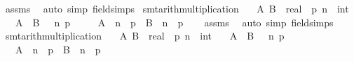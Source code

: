 \begin{isabellebody}
\ assms\ \isamarkupfalse%
\ {\isacharparenleft}{\kern0pt}auto\ simp{\isacharcolon}{\kern0pt}\ field{\isacharunderscore}{\kern0pt}simps{\isacharparenright}{\kern0pt}%
\endisatagproof
{\isafoldproof}%
%
\isadelimproof
\isanewline
%
\endisadelimproof
\isanewline
{}\isamarkupfalse%
\ {\isacharbrackleft}{\kern0pt}smt{\isacharunderscore}{\kern0pt}arith{\isacharunderscore}{\kern0pt}multiplication{\isacharbrackright}{\kern0pt}{\isacharcolon}{\kern0pt}\isanewline
\ \ \ A\ B\ {\isacharcolon}{\kern0pt}{\isacharcolon}{\kern0pt}\ real\ \ p\ n\ {\isacharcolon}{\kern0pt}{\isacharcolon}{\kern0pt}\ int\isanewline
\ \ \ {\isachardoublequoteopen}A\ {\isasymle}\ B{\isachardoublequoteclose}\ {\isachardoublequoteopen}{}\ {\isacharless}{\kern0pt}\ n{\isachardoublequoteclose}\ {\isachardoublequoteopen}p\ {\isachargreater}{\kern0pt}\ {}{\isachardoublequoteclose}\isanewline
\ \ \ {\isachardoublequoteopen}{\isacharparenleft}{\kern0pt}A\ {\isacharslash}{\kern0pt}\ n{\isacharparenright}{\kern0pt}\ {\isacharasterisk}{\kern0pt}\ p\ {\isasymle}\ {\isacharparenleft}{\kern0pt}B\ {\isacharslash}{\kern0pt}\ n{\isacharparenright}{\kern0pt}\ {\isacharasterisk}{\kern0pt}\ p{\isachardoublequoteclose}\isanewline
%
\isadelimproof
\ \ %
\endisadelimproof
%
\isatagproof
{}\isamarkupfalse%
\ assms\ \isamarkupfalse%
\ {\isacharparenleft}{\kern0pt}auto\ simp{\isacharcolon}{\kern0pt}\ field{\isacharunderscore}{\kern0pt}simps{\isacharparenright}{\kern0pt}%
\endisatagproof
{\isafoldproof}%
%
\isadelimproof
\isanewline
%
\endisadelimproof
\isanewline
{}\isamarkupfalse%
\ {\isacharbrackleft}{\kern0pt}smt{\isacharunderscore}{\kern0pt}arith{\isacharunderscore}{\kern0pt}multiplication{\isacharbrackright}{\kern0pt}{\isacharcolon}{\kern0pt}\isanewline
\ \ \ A\ B\ {\isacharcolon}{\kern0pt}{\isacharcolon}{\kern0pt}\ real\ \ p\ n\ {\isacharcolon}{\kern0pt}{\isacharcolon}{\kern0pt}\ int\isanewline
\ \ \ {\isachardoublequoteopen}A\ {\isacharless}{\kern0pt}\ B{\isachardoublequoteclose}\ {\isachardoublequoteopen}{}\ {\isacharless}{\kern0pt}\ n{\isachardoublequoteclose}\ {\isachardoublequoteopen}p\ {\isachargreater}{\kern0pt}\ {}{\isachardoublequoteclose}\isanewline
\ \ \ {\isachardoublequoteopen}{\isacharparenleft}{\kern0pt}A\ {\isacharslash}{\kern0pt}\ n{\isacharparenright}{\kern0pt}\ {\isacharasterisk}{\kern0pt}\ p\ {\isacharless}{\kern0pt}\ {\isacharparenleft}{\kern0pt}B\ {\isacharslash}{\kern0pt}\ n{\isacharparenright}{\kern0pt}\ {\isacharasterisk}{\kern0pt}\ p{\isachardoublequoteclose}\isanewline

\end{isabellebody}
